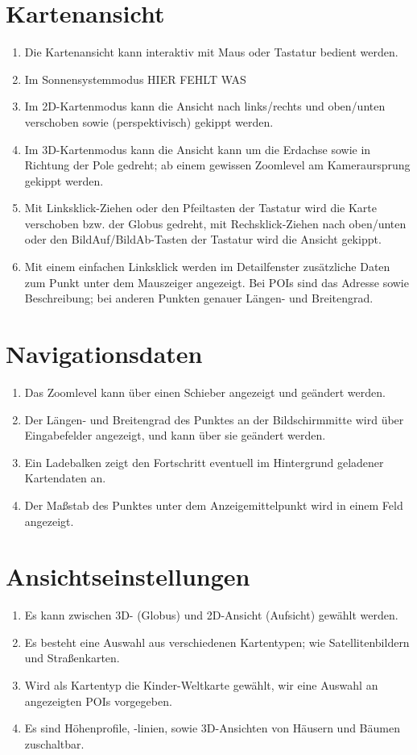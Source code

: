 \documentclass[10pt]{scrreprt}
\begin{document}
\section{Kartenansicht}
\begin{enumerate}[leftmargin=2cm,resume]
\item Die Kartenansicht kann interaktiv mit Maus oder Tastatur bedient werden.
\item \W Im Sonnensystemmodus HIER FEHLT WAS
\item Im 2D-Kartenmodus kann die Ansicht nach links/rechts und oben/unten verschoben sowie (perspektivisch) gekippt werden. 
\item Im 3D-Kartenmodus kann die Ansicht kann um die Erdachse sowie in Richtung der Pole gedreht; ab einem gewissen Zoomlevel am Kameraursprung gekippt werden.
\item Mit Linksklick-Ziehen oder den Pfeiltasten der Tastatur wird die Karte verschoben bzw. der Globus gedreht, mit Rechsklick-Ziehen nach oben/unten oder den BildAuf/BildAb-Tasten der Tastatur wird die Ansicht gekippt.
\item \W Mit einem einfachen Linksklick werden im Detailfenster zusätzliche Daten zum Punkt unter dem Mauszeiger angezeigt. Bei POIs sind das Adresse sowie Beschreibung; bei anderen Punkten genauer Längen- und Breitengrad.
\end{enumerate}
\section{Navigationsdaten}
\begin{enumerate}[leftmargin=2cm,resume]
\item Das Zoomlevel kann über einen Schieber angezeigt und geändert werden.
\item Der Längen- und Breitengrad des Punktes an der Bildschirmmitte wird über Eingabefelder angezeigt, und kann über sie geändert werden.
\item Ein Ladebalken zeigt den Fortschritt eventuell im Hintergrund geladener Kartendaten an.
\item Der Maßstab des Punktes unter dem Anzeigemittelpunkt wird in einem Feld angezeigt.
\end{enumerate}

\section{Ansichtseinstellungen}
\begin{enumerate}[leftmargin=2cm,resume]
\item Es kann zwischen 3D- (Globus) und 2D-Ansicht (Aufsicht) gewählt werden.
\item Es besteht eine Auswahl aus verschiedenen Kartentypen; wie Satellitenbildern und Straßenkarten.
\item \W Wird als Kartentyp die Kinder-Weltkarte gewählt, wir eine Auswahl an angezeigten POIs vorgegeben.
\item \W Es sind Höhenprofile, -linien, sowie 3D-Ansichten von Häusern und 
Bäumen zuschaltbar.
\end{enumerate}
\end{document}
